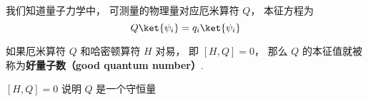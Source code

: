 

我们知道量子力学中， 可测量的物理量对应厄米算符 $Q$， 本征方程为
\begin{equation}\label{GoodQN_eq1}
Q \ket{\psi_i} = q_i \ket{\psi_i}
\end{equation}

\begin{definition}{}
如果厄米算符 $Q$ 和哈密顿算符 $H$ 对易， 即 $[H, Q] = 0$， 那么 $Q$ 的本征值就被称为\textbf{好量子数（good quantum number）}.
\end{definition}

$[H, Q] = 0$ 说明 $Q$ 是一个守恒量
